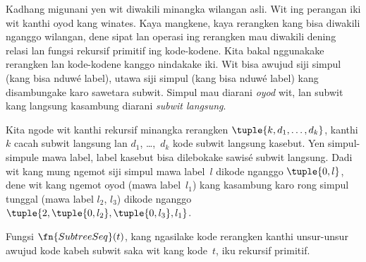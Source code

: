 \documentclass[../../../include/open-logic-section]{subfiles}
\begin{document}

Kadhang migunani yen wit diwakili minangka wilangan asli. Wit ing perangan iki wit kanthi oyod kang winates.
Kaya mangkene,
kaya rerangken kang bisa diwakili nganggo wilangan, dene
sipat lan operasi ing rerangken mau diwakili dening relasi
lan fungsi rekursif primitif ing kode-kodene. Kita bakal
nggunakake rerangken lan kode-kodene kanggo nindakake iki.
Wit bisa awujud siji simpul (kang bisa nduwé label),
utawa siji simpul (kang bisa nduwé label) kang
disambungake karo sawetara subwit. Simpul mau diarani
\emph{oyod} wit, lan subwit kang langsung kasambung
diarani \emph{subwit langsung}.

Kita ngode wit kanthi rekursif minangka rerangken
$\tuple{k, d_1, \dots, d_k}$, kanthi $k$ cacah subwit
langsung lan $d_1$, \dots,~$d_k$ kode subwit
langsung kasebut. Yen simpul-simpule mawa label,
label kasebut bisa dilebokake sawisé subwit langsung.
Dadi wit kang mung ngemot siji simpul mawa label~$l$
dikode nganggo $\tuple{0,l}$, dene wit kang ngemot
oyod (mawa label~$l_1$) kang kasambung karo rong
simpul tunggal (mawa label $l_2$, $l_3$)
dikode nganggo $\tuple{2,
  \tuple{0, l_2}, \tuple{0, l_3}, l_1}$.

\begin{prop}
  Fungsi $\fn{SubtreeSeq}(t)$, kang ngasilake kode
  rerangken kanthi unsur-unsur awujud kode kabeh
  subwit saka wit kang kode~$t$, iku rekursif primitif.
\end{prop}
\end{document}
